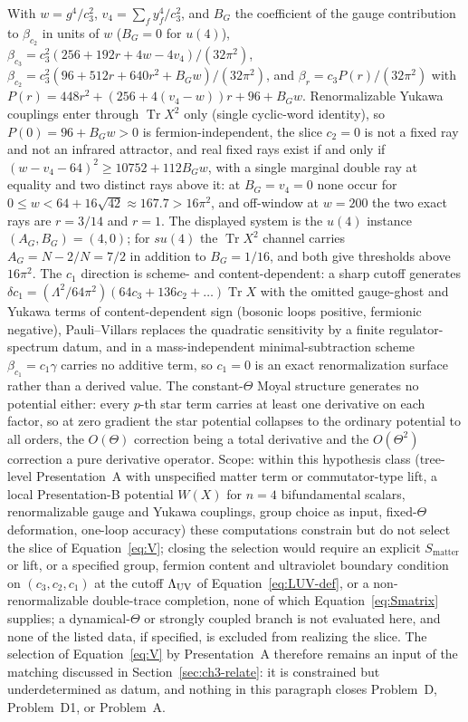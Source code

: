With \(w=g^4/c_3^2\), \(v_4=\sum_f y_f^4/c_3^2\), and \(B_G\) the coefficient of the gauge contribution to \(\beta_{c_2}\) in units of \(w\) (\(B_G=0\) for \(u(4)\)), \(\beta_{c_3}=c_3^2(256+192r+4w-4v_4)/(32\pi^2)\), \(\beta_{c_2}=c_3^2(96+512r+640r^2+B_Gw)/(32\pi^2)\), and \(\beta_r=c_3P(r)/(32\pi^2)\) with \(P(r)=448r^2+(256+4(v_4-w))r+96+B_Gw\).
Renormalizable Yukawa couplings enter through \(\operatorname{Tr}X^2\) only (single cyclic-word identity), so \(P(0)=96+B_Gw>0\) is fermion-independent, the slice \(c_2=0\) is not a fixed ray and not an infrared attractor, and real fixed rays exist if and only if \((w-v_4-64)^2\ge10752+112B_Gw\), with a single marginal double ray at equality and two distinct rays above it: at \(B_G=v_4=0\) none occur for \(0\le w<64+16\sqrt{42}\approx167.7>16\pi^2\), and off-window at \(w=200\) the two exact rays are \(r=3/14\) and \(r=1\). The displayed system is the \(u(4)\) instance \((A_G,B_G)=(4,0)\); for \(su(4)\) the \(\operatorname{Tr}X^2\) channel carries \(A_G=N-2/N=7/2\) in addition to \(B_G=1/16\), and both give thresholds above \(16\pi^2\).
The \(c_1\) direction is scheme- and content-dependent: a sharp cutoff generates \(\delta c_1=(\Lambda^2/64\pi^2)(64c_3+136c_2+\ldots)\operatorname{Tr}X\) with the omitted gauge-ghost and Yukawa terms of content-dependent sign (bosonic loops positive, fermionic negative), Pauli--Villars replaces the quadratic sensitivity by a finite regulator-spectrum datum, and in a mass-independent minimal-subtraction scheme \(\beta_{c_1}=c_1\gamma\) carries no additive term, so \(c_1=0\) is an exact renormalization surface rather than a derived value.
The constant-\(\Theta\) Moyal structure generates no potential either: every \(p\)-th star term carries at least one derivative on each factor, so at zero gradient the star potential collapses to the ordinary potential to all orders, the \(O(\Theta)\) correction being a total derivative and the \(O(\Theta^2)\) correction a pure derivative operator.
Scope: within this hypothesis class (tree-level Presentation~A with unspecified matter term or commutator-type lift, a local Presentation-B potential \(W(X)\) for \(n=4\) bifundamental scalars, renormalizable gauge and Yukawa couplings, group choice as input, fixed-\(\Theta\) deformation, one-loop accuracy) these computations constrain but do not select the slice of Equation~\eqref{eq:V}; closing the selection would require an explicit \(S_{\mathrm{matter}}\) or lift, or a specified group, fermion content and ultraviolet boundary condition on \((c_3,c_2,c_1)\) at the cutoff \(\Lambda_{\mathrm{UV}}\) of Equation~\eqref{eq:LUV-def}, or a non-renormalizable double-trace completion, none of which Equation~\eqref{eq:Smatrix} supplies; a dynamical-\(\Theta\) or strongly coupled branch is not evaluated here, and none of the listed data, if specified, is excluded from realizing the slice.
The selection of Equation~\eqref{eq:V} by Presentation~A therefore remains an input of the matching discussed in Section~\ref{sec:ch3-relate}: it is constrained but underdetermined as datum, and nothing in this paragraph closes Problem~D, Problem~D1, or Problem~A.

